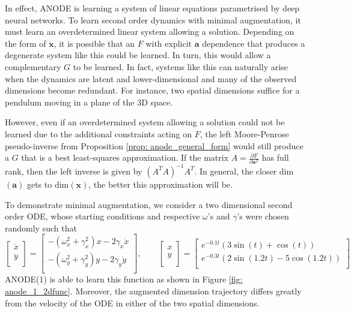 \documentclass{article}
\theoremstyle{remark}
\theoremstyle{definition}
\begin{document}
In effect, ANODE is learning a system of linear equations parametrised by deep neural networks. To learn second order dynamics with minimal augmentation, it must learn an overdetermined linear system allowing a solution. Depending on the form of $\ddot{\mathbf{x}}$, it is possible that an $F$ with explicit $\mathbf{a}$ dependence that produces a degenerate system like this could be learned. In turn, this would allow a complementary $G$ to be learned. In fact, systems like this can naturally arise when the dynamics are latent and lower-dimensional and many of the observed dimensions become redundant. For instance, two spatial dimensions suffice for a pendulum moving in a plane of the 3D space.    

However, even if an overdetermined system allowing a solution could not be learned due to the additional constraints acting on $F$, the left Moore-Penrose pseudo-inverse from Proposition \ref{prop: anode_general_form} would still produce a $G$ that is a best least-squares approximation. If the matrix $A = \frac{\partial F}{\partial \mathbf{a}^{T}}$ has full rank, then the left inverse is given by $(A^TA)^{-1}A^T$. In general, the closer dim$(\mathbf{a})$ gets to dim$(\mathbf{x})$, the better this approximation will be. 

To demonstrate minimal augmentation, we consider a two dimensional second order ODE, whose starting conditions and respective $\omega$'s and $\gamma$'s were chosen randomly such that
\begin{equation}
\label{eq:2d_function}
    \begin{bmatrix}
    \ddot{x} \\
    \ddot{y} \\
    \end{bmatrix}
    =
    \begin{bmatrix}
    -(\omega_{x}^{2} + \gamma_{x}^{2})x -2\gamma_{x}\dot{x} \\
    -(\omega_{y}^{2} + \gamma_{y}^{2})y -2\gamma_{y}\dot{y} \\
    \end{bmatrix},
\qquad
    \begin{bmatrix}
    x \\
    y \\
    \end{bmatrix}
    =
    \begin{bmatrix}
    e^{-0.1t}(3\sin(t)+\cos(t)) \\
    e^{-0.3t}(2\sin(1.2t)-5\cos(1.2t)) \\
    \end{bmatrix}
\end{equation}
ANODE(1) is able to learn this function as shown in Figure \ref{fig: anode_1_2dfunc}. Moreover, the augmented dimension trajectory differs greatly from the velocity of the ODE in either of the two spatial dimensions.
\end{document}
